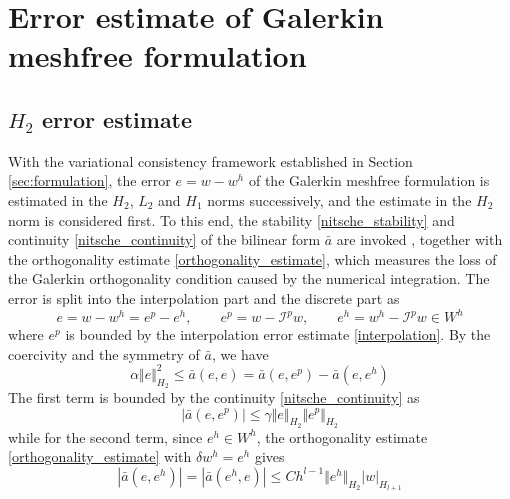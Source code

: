 \section{Error estimate of Galerkin meshfree formulation}\label{sec:error}

\subsection{$H_2$ error estimate}\label{sec:h2}

With the variational consistency framework established in Section \ref{sec:formulation}, the error $e=w-w^{h}$ of the Galerkin meshfree formulation is estimated in the $H_2$, $L_2$ and $H_1$ norms successively, and the estimate in the $H_2$ norm is considered first.
To this end, the stability \eqref{nitsche_stability} and continuity \eqref{nitsche_continuity} of the bilinear form $\bar a$ are invoked \cite{}, together with the orthogonality estimate \eqref{orthogonality_estimate}, which measures the loss of the Galerkin orthogonality condition caused by the numerical integration.
The error is split into the interpolation part and the discrete part as
\begin{equation}\label{error_split}
	e=w-w^{h}=e^p-e^h,\qquad e^p=w-\mathcal I^p w,\qquad e^h=w^{h}-\mathcal I^p w\in W^h
\end{equation}
where $e^p$ is bounded by the interpolation error estimate \eqref{interpolation}.
By the coercivity and the symmetry of $\bar a$, we have
\begin{equation}\label{h2_start}
	\alpha\Vert e \Vert_{H_2}^2\le\bar a(e,e)=\bar a(e,e^p)-\bar a(e,e^h)
\end{equation}
The first term is bounded by the continuity \eqref{nitsche_continuity} as
\begin{equation}\label{h2_ep}
	\left|\bar a(e,e^p)\right|\le\gamma\Vert e \Vert_{H_2}\Vert e^p \Vert_{H_2}
\end{equation}
while for the second term, since $e^h\in W^h$, the orthogonality estimate \eqref{orthogonality_estimate} with $\delta w^h=e^h$ gives
\begin{equation}\label{h2_eh}
	\left|\bar a(e,e^h)\right|=\left|\bar a(e^h,e)\right|\le C h^{l-1}\Vert e^h \Vert_{H_2}\vert w \vert_{H_{l+1}}
\end{equation}
